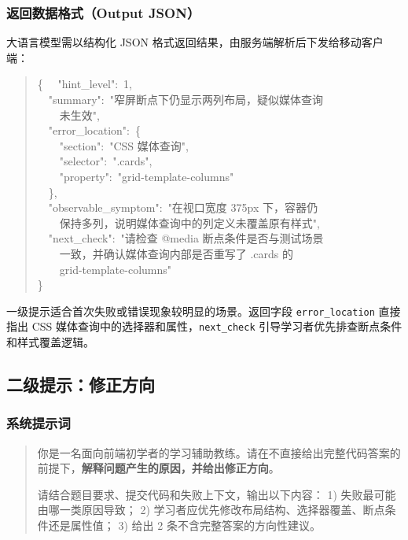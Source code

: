 \begin{appendices}
\subsubsection*{返回数据格式（Output JSON）}

大语言模型需以结构化 JSON 格式返回结果，由服务端解析后下发给移动客户端：

\begin{quote}\small\ttfamily
\{
\ \ "hint\_level":\ 1,\\
\ \ "summary":\ "窄屏断点下仍显示两列布局，疑似媒体查询\\
\ \ \ \ 未生效",\\
\ \ "error\_location":\ \{\\
\ \ \ \ "section":\ "CSS 媒体查询",\\
\ \ \ \ "selector":\ ".cards",\\
\ \ \ \ "property":\ "grid-template-columns"\\
\ \ \},\\
\ \ "observable\_symptom":\ "在视口宽度 375px 下，容器仍\\
\ \ \ \ 保持多列，说明媒体查询中的列定义未覆盖原有样式",\\
\ \ "next\_check":\ "请检查 @media 断点条件是否与测试场景\\
\ \ \ \ 一致，并确认媒体查询内部是否重写了 .cards 的\\
\ \ \ \ grid-template-columns"\\
\}
\end{quote}

一级提示适合首次失败或错误现象较明显的场景。返回字段 \texttt{error\_location} 直接指出 CSS 媒体查询中的选择器和属性，\texttt{next\_check} 引导学习者优先排查断点条件和样式覆盖逻辑。

\subsection*{二级提示：修正方向}

\subsubsection*{系统提示词}

\begin{quote}
你是一名面向前端初学者的学习辅助教练。请在不直接给出完整代码答案的前提下，\textbf{解释问题产生的原因，并给出修正方向}。

请结合题目要求、提交代码和失败上下文，输出以下内容：
1) 失败最可能由哪一类原因导致；
2) 学习者应优先修改布局结构、选择器覆盖、断点条件还是属性值；
3) 给出 2 条不含完整答案的方向性建议。
\end{quote}


\end{appendices}
